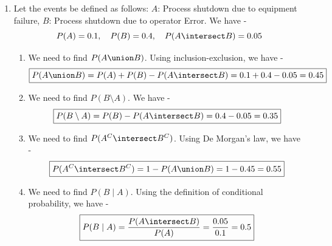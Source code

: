 \begin{enumerate}
        \[P(J) = P(A_j \mid A_p) \cdot P(A_p) + P(B_j \mid B_p) \cdot P(B_p) + P(C_j \mid C_p) \cdot P(C_p)\]
        \[\boxed{= 0.01 \cdot 0.6 + 0.05 \cdot 0.3 + 0.04 \cdot 0.1 = 0.006 + 0.015 + 0.004 = 0.025
        }\]
        \begin{enumerate}
            \item We need to find $P(A_j \mid J)$. Using Bayes' theorem, we have -
            \[P(A_j \mid J) = \frac{P(J \mid A_j) \cdot P(A_j)}{P(J)} = \frac{1 \cdot P(A_j)}{P(J)}\]
            \[\boxed{= \frac{P(A_j \mid A_p) \cdot P(A_p)}{P(J)} = \frac{0.01 \cdot 0.6}{0.025} = \frac{0.006}{0.025} = 0.24}\]
            \item We need to find $P(B_j \mid J)$. Using Bayes' theorem, we have -
            \[P(B_j \mid J) = \frac{P(J \mid B_j) \cdot P(B_j)}{P(J)} = \frac{1 \cdot P(B_j)}{P(J)}\]
            \[\boxed{= \frac{P(B_j \mid B_p) \cdot P(B_p)}{P(J)} = \frac{0.05 \cdot 0.3}{0.025} = \frac{0.015}{0.025} = 0.6}\]
            \item We need to find $P(C_j \mid J)$. Using Bayes' theorem, we have -
            \[P(C_j \mid J) = \frac{P(J \mid C_j) \cdot P(C_j)}{P(J)} = \frac{1 \cdot P(C_j)}{P(J)}\]
            \[\boxed{= \frac{P(C_j \mid C_p) \cdot P(C_p)}{P(J)} = \frac{0.04 \cdot 0.1}{0.025} = \frac{0.004}{0.025} = 0.16}\]
        \end{enumerate}
        \item Let the events be defined as follows:
        $A$: Process shutdown due to equipment failure, $B$: Process shutdown due to operator Error. We have - 
        $$P(A) = 0.1, \quad P(B) = 0.4, \quad P(A \intersect B) = 0.05$$
        \begin{enumerate}
            \item We need to find $P(A \union B)$. Using inclusion-exclusion, we have -
            \[\boxed{P(A \union B) = P(A) + P(B) - P(A \intersect B) = 0.1 + 0.4 - 0.05 = 0.45
            }\]
            \item We need to find $P(B \setminus A)$. We have -
            \[\boxed{P(B \setminus A) = P(B) - P(A \intersect B) = 0.4 - 0.05 = 0.35
            }\]
            \item We need to find $P(A^C \intersect B^C)$. Using De Morgan's law, we have -
            \[\boxed{P(A^C \intersect B^C) = 1 - P(A \union B) = 1 - 0.45 = 0.55
            }\]
            \item We need to find $P(B\mid A)$. Using the definition of conditional probability, we have -
            \[\boxed{P(B\mid A) = \frac{P(A \intersect B)}{P(A)} = \frac{0.05}{0.1} = 0.5
}\]
\end{enumerate}
\end{enumerate}

